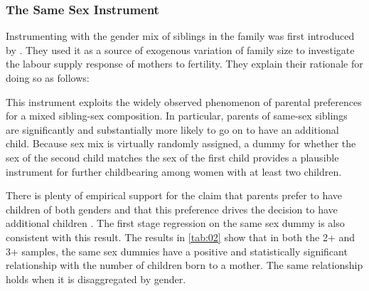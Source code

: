 \subsubsection*{The Same Sex Instrument}

Instrumenting with the gender mix of siblings in the family was first introduced by \textcite{angrist_children_1998}. They used it as a source of exogenous variation of family size to investigate the labour supply response of mothers to fertility. They explain their rationale for doing so as follows:

\begin{displayquote}
This instrument exploits the widely observed phenomenon of parental preferences for a mixed sibling-sex composition. In particular, parents of same-sex siblings are significantly and substantially more likely to go on to have an additional child. Because sex mix is virtually randomly assigned, a dummy for whether the sex of the second child matches the sex of the first child provides a plausible instrument for further childbearing among women with at least two children. 
\end{displayquote}

There is plenty of empirical support for the claim that parents prefer to have children of both genders and that this preference drives the decision to have additional children \parencite{norling_measuring_2018,bisbee_local_2015}. The first stage regression on the same sex dummy is also consistent with this result. The results in \autoref{tab:02} show that in both the 2+ and 3+ samples, the same sex dummies have a positive and statistically significant relationship with the number of children born to a mother. The same relationship holds when it is disaggregated by gender.


